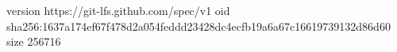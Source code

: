 version https://git-lfs.github.com/spec/v1
oid sha256:1637a174ef67f478d2a054feddd23428dc4ecfb19a6a67c16619739132d86d60
size 256716
